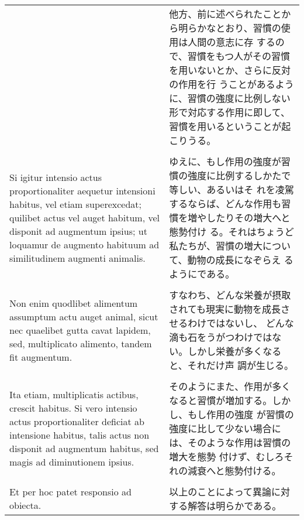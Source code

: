 \documentclass[10pt]{jsarticle} %
\begin{document}
\begin{longtable}{p{21em}p{21em}}
&

他方、前に述べられたことから明らかなとおり、習慣の使用は人間の意志に存
 するので、習慣をもつ人がその習慣を用いないとか、さらに反対の作用を行
 うことがあるように、習慣の強度に比例しない形で対応する作用に即して、
 習慣を用いるということが起こりうる。

\\\\

Si igitur intensio
actus proportionaliter aequetur intensioni habitus, vel etiam
superexcedat; quilibet actus vel auget habitum, vel disponit ad
augmentum ipsius; ut loquamur de augmento habituum ad similitudinem
augmenti animalis. 



&

ゆえに、もし作用の強度が習慣の強度に比例するしかたで等しい、あるいはそ
 れを凌駕するならば、どんな作用も習慣を増やしたりその増大へと態勢付け
 る。それはちょうど私たちが、習慣の増大について、動物の成長になぞらえ
 るようにである。

\\\\

Non enim quodlibet alimentum assumptum actu auget
animal, sicut nec quaelibet gutta cavat lapidem, sed, multiplicato
alimento, tandem fit augmentum. 


&

すなわち、どんな栄養が摂取されても現実に動物を成長させるわけではないし、
 どんな滴も石をうがつわけではない。しかし栄養が多くなると、それだけ声
 調が生じる。

\\\\


Ita etiam, multiplicatis actibus,
crescit habitus. Si vero intensio actus proportionaliter deficiat ab
intensione habitus, talis actus non disponit ad augmentum habitus, sed
magis ad diminutionem ipsius.

&

そのようにまた、作用が多くなると習慣が増加する。しかし、もし作用の強度
が習慣の強度に比して少ない場合には、そのような作用は習慣の増大を態勢
付けず、むしろそれの減衰へと態勢付ける。

\\\\



Et per hoc patet responsio ad obiecta.

&

以上のことによって異論に対する解答は明らかである。

\end{longtable}
\end{document}
